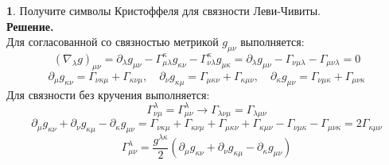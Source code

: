 \documentclass[12pt]{article}
\theoremstyle{definition}
\newtheorem{zad}{}[section]
\begin{document}
\begin{zad}\label{zad1}
Получите символы Кристоффеля для связности Леви-Чивиты.\\ 
\textbf{Решение.}\\
Для согласованной со связностью метрикой $g_{\mu\nu}$ выполняется:
\begin{equation}
    (\nabla_\lambda g)_{\mu\nu}=\partial_\lambda g_{\mu\nu}-\Gamma_{\mu\lambda}^\kappa g_{\kappa\nu}-\Gamma_{\nu\lambda}^\kappa g_{\mu\kappa}=\partial_\lambda g_{\mu\nu}-\Gamma_{\nu\mu\lambda}-\Gamma_{\mu\nu\lambda}=0
\end{equation}
\begin{equation}
    \partial_\mu g_{\kappa\nu}=\Gamma_{\nu\kappa\mu}+\Gamma_{\kappa\nu\mu},\quad \partial_\nu g_{\kappa\mu}=\Gamma_{\mu\kappa\nu}+\Gamma_{\kappa\mu\nu},\quad \partial_\kappa g_{\mu\nu}=\Gamma_{\nu\mu\kappa}+\Gamma_{\mu\nu\kappa}
\end{equation}
Для связности без кручения выполняется:
\begin{equation}
    \Gamma^\lambda_{\nu\mu}=\Gamma^\lambda_{\mu\nu}\rightarrow \Gamma_{\lambda\nu\mu}=\Gamma_{\lambda\mu\nu}
\end{equation}
\begin{equation}
    \partial_\mu g_{\kappa\nu}+\partial_\nu g_{\kappa\mu}-\partial_\kappa g_{\mu\nu}=\Gamma_{\nu\kappa\mu}+\Gamma_{\kappa\nu\mu}+\Gamma_{\mu\kappa\nu}+\Gamma_{\kappa\mu\nu}-\Gamma_{\nu\mu\kappa}-\Gamma_{\mu\nu\kappa}=2\Gamma_{\kappa\mu\nu}
\end{equation}
\begin{equation}
    \boxed{\Gamma^\lambda_{\mu\nu}=\frac{g^{\lambda\kappa}}{2}(\partial_\mu g_{\kappa\nu}+\partial_\nu g_{\kappa\mu}-\partial_\kappa g_{\mu\nu})}
\end{equation}
\end{zad}
\end{document}
